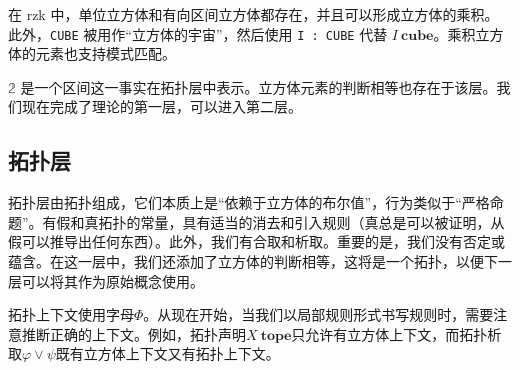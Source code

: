 \documentclass{ctexrep}
\theoremstyle{plain}
\theoremstyle{definition}
\theoremstyle{remark}
\theoremstyle{definition}
\theoremstyle{definition}
\theoremstyle{definition}
\newcommand{\tope}{\mathbf{tope}}
\begin{document}
在 rzk 中，单位立方体和有向区间立方体都存在，并且可以形成立方体的乘积。此外，\verb|CUBE| 被用作“立方体的宇宙”，然后使用 \verb|I : CUBE| 代替 \(I\ \textbf{cube}\)。乘积立方体的元素也支持模式匹配。

\(\mathbb{2}\) 是一个区间这一事实在拓扑层中表示。立方体元素的判断相等也存在于该层。我们现在完成了理论的第一层，可以进入第二层。

\subsection{拓扑层}

拓扑层由拓扑组成，它们本质上是“依赖于立方体的布尔值”，行为类似于“严格命题”。有假和真拓扑的常量，具有适当的消去和引入规则（真总是可以被证明，从假可以推导出任何东西）。此外，我们有合取和析取。重要的是，我们没有否定或蕴含。在这一层中，我们还添加了立方体的判断相等，这将是一个拓扑，以便下一层可以将其作为原始概念使用。

拓扑上下文使用字母$\Phi$。从现在开始，当我们以局部规则形式书写规则时，需要注意推断正确的上下文。例如，拓扑声明$X\ \tope$只允许有立方体上下文，而拓扑析取$\varphi\lor\psi$既有立方体上下文又有拓扑上下文。
\end{document}
